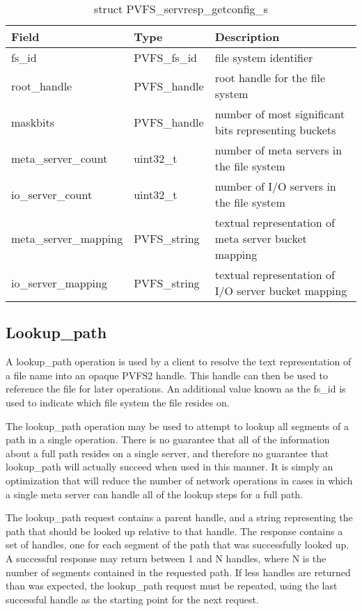 \documentclass[11pt, letterpaper]{article} %
\begin{document}
\begin{table}[H]
\begin{tabular}{|l|l|l|}
\hline
Field & Type & Description \\
\hline
fs\_id & PVFS\_fs\_id & file system identifier\\
\hline
root\_handle & PVFS\_handle & root handle for the file system\\
\hline
maskbits & PVFS\_handle & number of most significant bits representing buckets\\
\hline
meta\_server\_count & uint32\_t & number of meta servers in the file
system\\
\hline
io\_server\_count & uint32\_t & number of I/O servers in the file
system\\
\hline
meta\_server\_mapping & PVFS\_string & textual representation of
meta server bucket mapping\\
\hline
io\_server\_mapping & PVFS\_string & textual representation of
I/O server bucket mapping\\
\hline
\end{tabular}
\caption{struct PVFS\_servresp\_getconfig\_s
\label{tab:respgetconfig}}
\end{table}


\subsection{Lookup\_path}

A lookup\_path operation is used by a client to resolve the text
representation of a file name into an opaque PVFS2 handle.  This handle
can then be used to reference the file for later operations.  An
additional value known as the fs\_id is
used to indicate which file system the file resides on.

The lookup\_path operation may be used to attempt to lookup
all segments of a path in a single operation.  There is no
guarantee that all of the information about a full path resides on a
single server, and therefore no guarantee that lookup\_path will
actually succeed when used in this manner.  It is simply an optimization that will reduce
the number of network operations in cases in which a single meta server
can handle all of the lookup steps for a full path.  

The lookup\_path request contains a parent handle, and a string
representing the path that should be looked up relative to that
handle.  The response contains a set of handles, one for each
segment of the path that was successfully looked up.  A successful
response may return between 1 and N handles, where N is the number
of segments contained in the requested path.  If less handles are
returned than was expected, the lookup\_path request must be
repeated, using the last successful handle as the starting point
for the next request.
\end{document}
